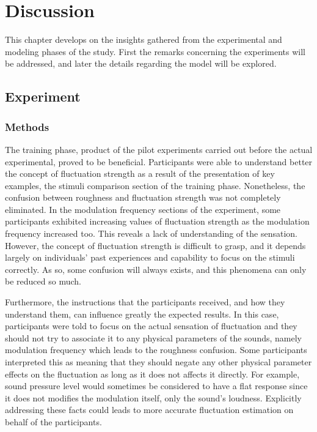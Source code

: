 \documentclass[../main.tex]{subfiles}
\begin{document}
\chapter{Discussion}

This chapter develops on the insights gathered from the experimental and
modeling phases of the study. First the remarks concerning the experiments will
be addressed, and later the details regarding the model will be explored.

\section{Experiment}

\subsection{Methods}

The training phase, product of the pilot experiments carried out before the
actual experimental, proved to be beneficial. Participants were able to
understand better the concept of fluctuation strength as a result of the
presentation of key examples, the stimuli comparison section of the training
phase. Nonetheless, the confusion between roughness and fluctuation strength was
not completely eliminated. In the modulation frequency sections of the
experiment, some participants exhibited increasing values of fluctuation
strength as the modulation frequency increased too. This reveals a lack of
understanding of the sensation. However, the concept of fluctuation strength is
difficult to grasp, and it depends largely on individuals' past experiences and
capability to focus on the stimuli correctly. As so, some confusion will always
exists, and this phenomena can only be reduced so much.

Furthermore, the instructions that the participants received, and how they
understand them, can influence greatly the expected results. In this case,
participants were told to focus on the actual sensation of fluctuation and they
should not try to associate it to any physical parameters of the sounds, namely
modulation frequency which leads to the roughness confusion. Some participants
interpreted this as meaning that they should negate any other physical parameter
effects on the fluctuation as long as it does not affects it directly. For
example, sound pressure level would sometimes be considered to have a flat
response since it does not modifies the modulation itself, only the sound's
loudness. Explicitly addressing these facts could leads to more accurate
fluctuation estimation on behalf of the participants.
\end{document}
